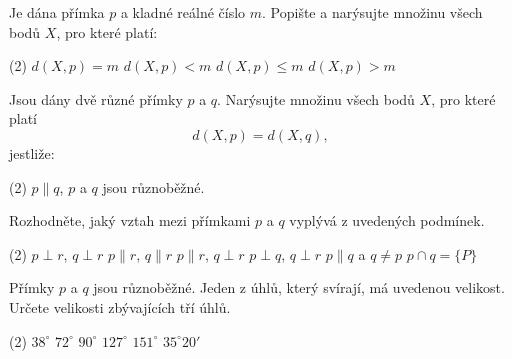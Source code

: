 \documentclass[12pt,a4paper]{article}
\begin{document}
\begin{exercise}

    Je dána přímka $p$ a kladné reálné číslo $m$.
    Popište a narýsujte množinu všech bodů $X$, pro které platí:

    \begin{tasks}(2)
        \task $d(X,p)=m$
        \task $d(X,p)<m$
        \task $d(X,p)\leq m$
        \task $d(X,p)>m$
    \end{tasks}

\end{exercise}



\begin{exercise}

    Jsou dány dvě různé přímky $p$ a $q$.
    Narýsujte množinu všech bodů $X$, pro které platí
    \[
        d(X,p)=d(X,q),
    \]
    jestliže:

    \begin{tasks}(2)
        \task $p\parallel q$,
        \task $p$ a $q$ jsou různoběžné.
    \end{tasks}

\end{exercise}



\begin{exercise}

    Rozhodněte, jaký vztah mezi přímkami $p$ a $q$ vyplývá z uvedených podmínek.

    \begin{tasks}(2)
        \task $p\perp r$, $q\perp r$
        \task $p\parallel r$, $q\parallel r$
        \task $p\parallel r$, $q\perp r$
        \task $p\perp q$, $q\perp r$
        \task $p\parallel q$ a $q\neq p$
        \task $p\cap q=\{P\}$
    \end{tasks}

\end{exercise}



\begin{exercise}

    Přímky $p$ a $q$ jsou různoběžné. Jeden z úhlů, který svírají, má uvedenou velikost.
    Určete velikosti zbývajících tří úhlů.

    \begin{tasks}(2)
        \task $38^\circ$
        \task $72^\circ$
        \task $90^\circ$
        \task $127^\circ$
        \task $151^\circ$
        \task $35^\circ 20'$
    \end{tasks}

\end{exercise}
\end{document}
